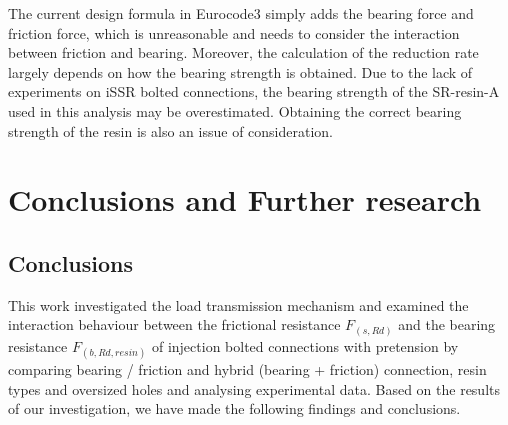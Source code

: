The current design formula in Eurocode3 simply adds the bearing force and friction force, which is unreasonable and needs to consider the interaction between friction and bearing. Moreover, the calculation of the reduction rate largely depends on how the bearing strength is obtained. Due to the lack of experiments on iSSR bolted connections, the bearing strength of the SR-resin-A used in this analysis may be overestimated. Obtaining the correct bearing strength of the resin is also an issue of consideration.

\section{Conclusions and Further research}

\subsection{Conclusions}

This work investigated the load transmission mechanism and examined the interaction behaviour between the frictional resistance $F_{(s,Rd)}$ and the bearing resistance $F_{(b,Rd,resin)}$ of injection bolted connections with pretension by comparing bearing / friction and hybrid (bearing + friction) connection, resin types and oversized holes and analysing experimental data. Based on the results of our investigation, we have made the following findings and conclusions.

